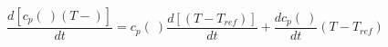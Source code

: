 \begin{equation}
\frac{d [c_p(\ ) (T- )]}{dt} =c_p(\ ) \frac{d [ (T- T_{ref})]}{dt} + \frac{d c_p(\ )}{dt} (T- T_{ref})
\end{equation}
